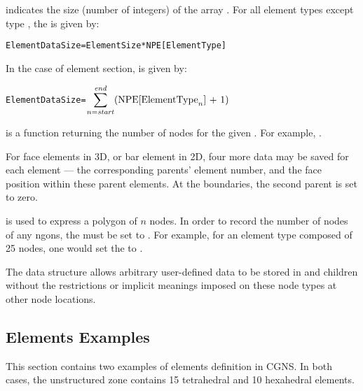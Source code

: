  indicates the size (number of integers) of the array
.
For all element types except type , the 
is given by:

\begin{alltt}
  ElementDataSize = ElementSize * NPE[ElementType]
\end{alltt}

In the case of  element section,  is
given by:

\begin{alltt}
  ElementDataSize = \(\displaystyle\sum\sb{n=\mbox{\scriptsize\ital{start}}}\sp{\mbox{\scriptsize\ital{end}}} (\mbox{NPE[ElementType}\sb{n}\mbox{] + 1})\)
\end{alltt}

 is a function returning the number of nodes for the
given .
For example, .

For face elements in 3D, or bar element in 2D, four more data may be
saved for each element --- the corresponding parents' element number,
and the face position within these parent elements.
At the boundaries, the second parent is set to zero.

 is used to express a polygon of $n$ nodes.
In order to record the number of nodes of any ngons, the 
must be set to .
For example, for an element type  composed of 25
nodes, one would set the  to .

The  data structure allows arbitrary
user-defined data to be stored in  and
 children without the restrictions or implicit
meanings imposed on these node types at other node locations.

\subsection{Elements Examples}
\label{s:element_example}

This section contains two examples of elements definition in CGNS.
In both cases, the unstructured zone contains 15 tetrahedral and 10
hexahedral elements.

